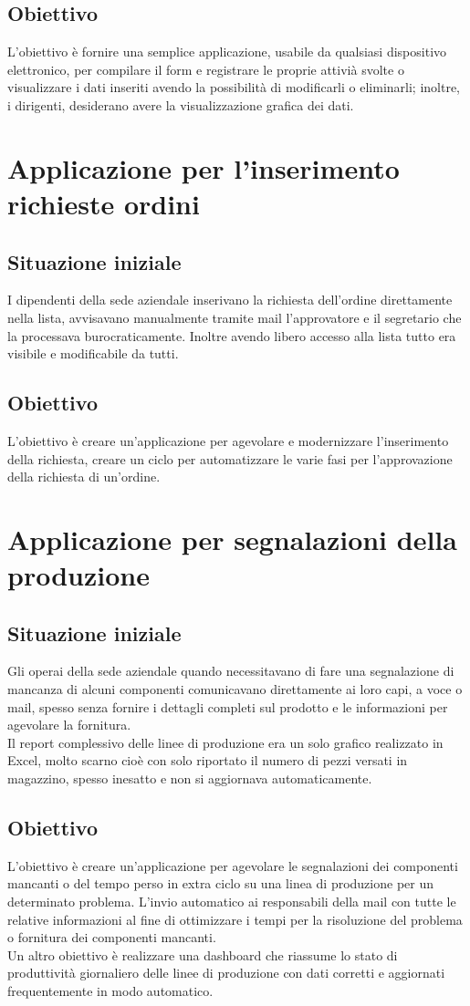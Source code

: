 \subsection{Obiettivo}
L'obiettivo è fornire una semplice applicazione, usabile da qualsiasi dispositivo elettronico, per compilare il form e registrare le proprie attivià svolte o visualizzare i dati inseriti avendo la possibilità di modificarli o eliminarli; inoltre, i dirigenti, desiderano avere la visualizzazione grafica dei dati.


\section{Applicazione per l'inserimento richieste ordini}
\subsection{Situazione iniziale}
I dipendenti della sede aziendale inserivano la richiesta dell'ordine direttamente nella lista, avvisavano manualmente tramite mail l'approvatore e il segretario che la processava burocraticamente. Inoltre avendo libero accesso alla lista tutto era visibile e modificabile da tutti.
\subsection{Obiettivo}
L'obiettivo è creare un'applicazione per agevolare e modernizzare l'inserimento della richiesta, creare un ciclo per automatizzare le varie fasi per l'approvazione della richiesta di un'ordine.


\section{Applicazione per segnalazioni della produzione}
\subsection{Situazione iniziale}
Gli operai della sede aziendale quando necessitavano di fare una segnalazione di mancanza di alcuni componenti comunicavano direttamente ai loro capi, a voce o mail, spesso senza fornire i dettagli completi sul prodotto e le informazioni per agevolare la fornitura.\\
Il report complessivo delle linee di produzione era un solo grafico realizzato in Excel, molto scarno cioè con solo riportato il numero di pezzi versati in magazzino, spesso inesatto e non si aggiornava automaticamente.
\subsection{Obiettivo}
L'obiettivo è creare un'applicazione per agevolare le segnalazioni dei componenti mancanti o del tempo perso in extra ciclo su una linea di produzione per un determinato problema.
L'invio automatico ai responsabili della mail con tutte le relative informazioni al fine di ottimizzare i tempi per la risoluzione del problema o fornitura dei componenti mancanti.\\
Un altro obiettivo è realizzare una dashboard che riassume lo stato di produttività giornaliero delle linee di produzione con dati corretti e aggiornati frequentemente in modo automatico.
